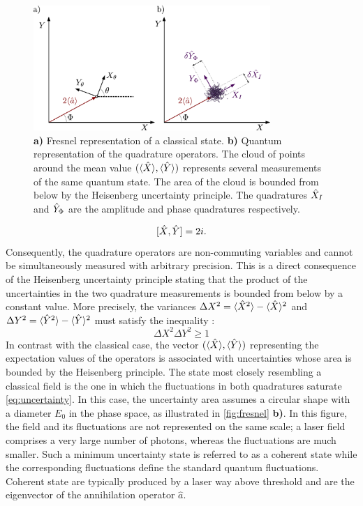 \begin{figure}
    \centering
    \includegraphics[width=0.8\textwidth]{chap_correlation/fig/fresnel.pdf}
    \caption{ \textbf{a)} Fresnel representation of a classical state. \textbf{b)} Quantum representation 
    of the quadrature operators. The cloud of points around the mean value $(\langle \hat{X} \rangle, \langle \hat{Y} \rangle)$ represents several measurements of the same quantum state. The area of the cloud 
    is bounded from below by the Heisenberg uncertainty principle. The quadratures $\hat{X}_{I}$ and $\hat{Y}_{\Phi}$ are the amplitude and phase quadratures respectively.}
    \label{fig:fresnel}
\end{figure}


\begin{equation}
    \label{eq:commut}
    [\hat{X},\hat{Y}] = 2i.
\end{equation}
Consequently, the quadrature operators are non-commuting variables and cannot be simultaneously measured with arbitrary precision. This is a direct consequence of the Heisenberg uncertainty principle stating that the product of the uncertainties in the two quadrature measurements is bounded from below by a constant value.
More precisely, the variances $\Delta X^2 = \langle \hat{X}^2 \rangle - \langle \hat{X} \rangle^2$ and $\Delta Y^2 = \langle \hat{Y}^2 \rangle - \langle \hat{Y} \rangle^2$ must satisfy the inequality :
\begin{equation}
    \label{eq:uncertainty}
    \Delta X^2 \Delta Y^2 \geq 1
\end{equation}
In contrast with the classical case, the vector $(\langle \hat{X} \rangle, \langle \hat{Y} \rangle)$ representing the expectation values of the operators is associated with uncertainties whose area is bounded by the Heisenberg principle. 
The state most closely resembling a classical field is the one in which the fluctuations in both quadratures saturate \autoref{eq:uncertainty}. In this case, the uncertainty area assumes a circular shape with a diameter $E_0$ in the phase space, as illustrated in \autoref{fig:fresnel} \textbf{b)}. In this figure, the field and its fluctuations are not represented on the same scale; a laser field comprises a very large number of photons, whereas the fluctuations are much smaller. 
Such a minimum uncertainty state is referred to as a coherent state while the corresponding fluctuations define the standard quantum fluctuations. Coherent
state are typically produced by a laser way above threshold and are the eigenvector of the annihilation operator $\hat{a}$.

